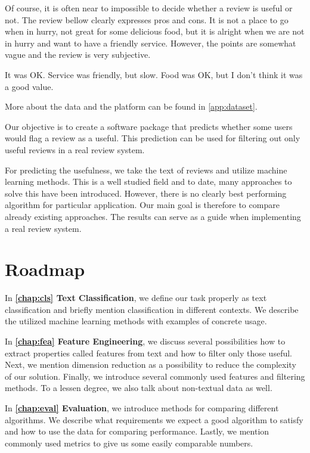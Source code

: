 Of course, it is often near to impossible to decide whether a review is useful or not.
The review bellow clearly expresses pros and cons.
It is not a place to go when in hurry, not great for some delicious food,
but it is alright when we are not in hurry and want to have a friendly service.
However, the points are somewhat vague and the review is very subjective.

\begin{code}
It was OK. Service was friendly, but slow.
Food was OK, but I don't think it was a good value.
\end{code}


More about the data and the platform can be found in \autoref{app:dataset}.

Our objective is to create a software package that predicts whether some users would flag a review as a useful.
This prediction can be used for filtering out only useful reviews in a real review system.

For predicting the usefulness, we take the text of reviews and utilize machine learning methods.
This is a well studied field and to date, many approaches to solve this have been introduced.
However, there is no clearly best performing algorithm for particular application.
Our main goal is therefore to compare already existing approaches.
The results can serve as a guide when implementing a real review system.

\section{Roadmap}

In \textbf{\autoref{chap:cls} Text Classification}, we define our task properly as text classification and briefly mention classification in different contexts.
We describe the utilized machine learning methods with examples of concrete usage.

In \textbf{\autoref{chap:fea} Feature Engineering}, we discuss several possibilities how to extract properties called features from text and how to filter only those useful.
Next, we mention dimension reduction as a possibility to reduce the complexity of our solution.
Finally, we introduce several commonly used features and filtering methods.
To a lessen degree, we also talk about non-textual data as well.

In \textbf{\autoref{chap:eval} Evaluation}, we introduce methods for comparing different algorithms.
We describe what requirements we expect a good algorithm to satisfy and how to use the data for comparing performance.
Lastly, we mention commonly used metrics to give us some easily comparable numbers.

